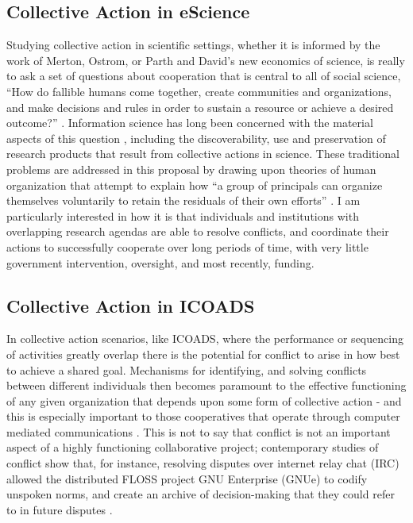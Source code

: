 \documentclass[thesis,tocnosub,noragright,centerchapter,12pt]{uiucecethesis09}
\begin{document}
\subsection*{Collective Action in eScience}

Studying collective action in scientific settings, whether it is
informed by the work of Merton, Ostrom, or Parth and David's new
economics of science, is really to ask a set of questions about
cooperation that is central to all of social science, ``How do fallible
humans come together, create communities and organizations, and make
decisions and rules in order to sustain a resource or achieve a desired
outcome?'' \citep[p. 42]{hess2007understanding}. Information science has long
been concerned with the material aspects of this question \citep{bates1999invisible}, including the
discoverability, use and preservation of research products that result
from collective actions in science. These traditional
problems are addressed in this proposal by drawing upon theories of
human organization that attempt to explain how ``a group of principals
can organize themselves voluntarily to retain the residuals of their own
efforts'' \citep[p.25]{ostrom1990governing}. I am particularly interested in how it is
that individuals and institutions with overlapping research agendas are
able to resolve conflicts, and coordinate their actions to
successfully cooperate over long periods of time, with very little
government intervention, oversight, and most recently, funding.\\

\subsection*{Collective Action in ICOADS}

In collective action scenarios, like ICOADS, where the performance or
sequencing of activities greatly overlap there is the potential for
conflict to arise in how best to achieve a shared goal. Mechanisms for
identifying, and solving conflicts between different individuals then
becomes paramount to the effective functioning of any given organization
that depends upon some form of collective action - and this is
especially important to those cooperatives that operate through
computer mediated communications \citep{easterbrook1993survey}. This is not
to say that conflict is not an important aspect of a highly functioning
collaborative project; contemporary studies of conflict show that, for
instance, resolving disputes over internet relay chat (IRC) allowed the
distributed FLOSS project GNU Enterprise (GNUe) to codify unspoken
norms, and create an archive of decision-making that they could refer to
in future disputes \citep[similar observations are made in \citep{coleman2005three}]{elliott2003free} .\\
\end{document}
